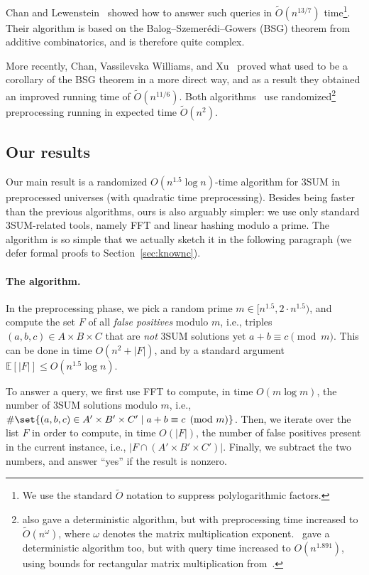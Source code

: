 \documentclass[10pt,a4paper]{article}
\newcommand{\Ot}{\widetilde{O}}
\newcommand{\E}{\mathbb{E}}
\begin{document}
Chan and Lewenstein~\cite{ChanL15} showed how to answer such queries in $\Ot(n^{13/7})$ time\footnote{We use the standard $\Ot$ notation to suppress polylogarithmic factors.}. Their algorithm is based on the Balog--Szemer\'edi--Gowers (BSG) theorem from additive combinatorics, and is therefore quite complex.

More recently, Chan, Vassilevska Williams, and Xu~\cite{ChanWX23} proved what used to be a corollary of the BSG theorem in a more direct way, and as a result they obtained an improved running time of $\Ot(n^{11/6})$. Both algorithms~\cite{ChanL15,ChanWX23} use randomized\footnote{\cite{ChanL15} also gave a deterministic algorithm, but with preprocessing time increased to $\Ot(n^\omega)$, where $\omega$ denotes the matrix multiplication exponent.~\cite{ChanWX23} gave a deterministic algorithm too, but with query time increased to $O(n^{1.891})$, using bounds for rectangular matrix multiplication from~\cite{LeGallU18}.} preprocessing running in expected time $\Ot(n^2)$.

\subsection{Our results}
\label{sec:ourresults}

Our main result is a randomized $O(n^{1.5} \log n)$-time algorithm for 3SUM in preprocessed universes (with quadratic time preprocessing). Besides being faster than the previous algorithms, ours is also arguably simpler: we use only standard 3SUM-related tools, namely FFT and linear hashing modulo a prime. The algorithm is so simple that we actually sketch it in the following paragraph (we defer formal proofs to Section~\ref{sec:knownc}).

\paragraph{The algorithm.}
In the preprocessing phase, we pick a random prime $m \in [n^{1.5}, 2\cdot n^{1.5})$, and compute the set $F$ of all \emph{false positives} modulo $m$, i.e., triples $(a,b,c) \in A \times B \times C$ that are \emph{not} 3SUM solutions yet $a + b \equiv c \pmod{m}$. This can be done in time $O(n^2 + |F|)$, and by a standard argument $\E[|F|] \leqslant O(n^{1.5} \log n)$.

To answer a query, we first use FFT to compute, in time $O(m \log m)$, the number of 3SUM solutions modulo $m$, i.e., $\#\set{(a, b, c) \in A' \times B' \times C' \mid a + b \equiv c \pmod{m}}$. Then, we iterate over the list $F$ in order to compute, in time $O(|F|)$, the number of false positives present in the current instance, i.e., $|F \cap (A' \times B' \times C')|$. Finally, we subtract the two numbers, and answer ``yes'' if the result is nonzero.
\end{document}
